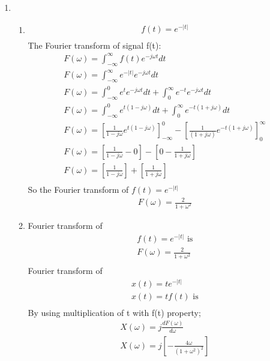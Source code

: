 \documentclass[10pt,a4paper, margin=1in]{article}
\begin{document}
\begin{enumerate}
\item %
    \begin{enumerate}
    \item %
    \begin{align*}
        f(t) = e^{-|t|}\\
    \end{align*}
The Fourier transform of signal f(t):
    \begin{align*}
        F(\omega) = \int_{-\infty}^{\infty} f(t)e^{-j\omega t}dt\\
        F(\omega) = \int_{-\infty}^{\infty} e^{-|t|}e^{-j\omega t}dt\\
        F(\omega) = \int_{-\infty}^{0} e^{t}e^{-j\omega t}dt + \int_{0}^{\infty} e^{-t}e^{-j\omega t}dt\\
        F(\omega) = \int_{-\infty}^{0} e^{t(1-j\omega)}dt + \int_{0}^{\infty} e^{-t(1+j\omega)}dt\\
        F(\omega) = [\frac{1}{1-j\omega}e^{t(1-j\omega)}]_{-\infty}^{0} - [\frac{1}{(1+j\omega)}e^{-t(1+j\omega)}]_{0}^{\infty}\\
        F(\omega) = [\frac{1}{1-j\omega} - 0] -[0 - \frac{1}{1+j\omega}]\\
        F(\omega) = [\frac{1}{1-j\omega}] + [\frac{1}{1+j\omega}]\\
    \end{align*}
So the Fourier transform of  \(f(t) = e^{-|t|}\)
    \begin{align*}
        F(\omega) = \frac{2}{1+\omega^2}
    \end{align*}
    \item %
    Fourier transform of 
    \begin{align*}
        f(t) = e^{-|t|} \text{ is}\\
        F(\omega) = \frac{2}{1+\omega^2}\\
    \end{align*}
    Fourier transform of
    \begin{align*}
        x(t) = te^{-|t|}\\
        x(t) = tf(t) \text{ is}\\
    \end{align*}
By using multiplication of t with f(t) property;
    \begin{align*}
        X(\omega) = j\frac{dF(\omega)}{d\omega}\\
        X(\omega) = j[-\frac{4\omega}{(1+\omega^2)^2}]\\

\end{align*}
\end{enumerate}
\end{enumerate}
\end{document}
